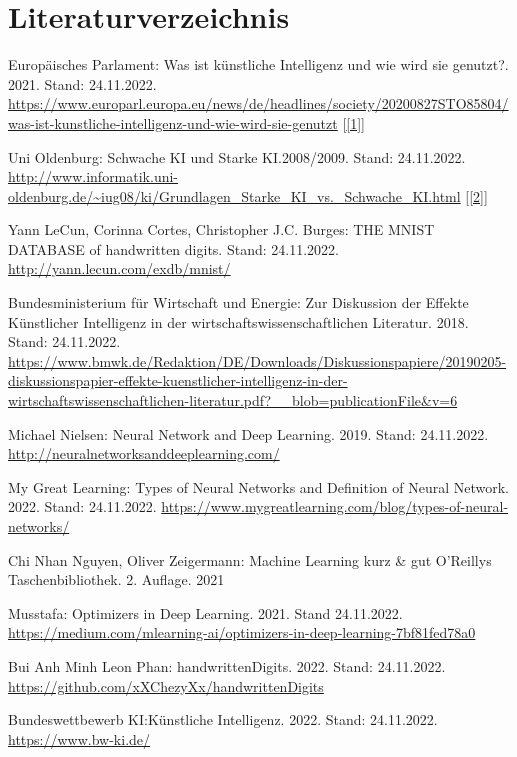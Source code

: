 \documentclass[11pt]{article}
\begin{document}
\newpage
\nolinenumbers{}
\section{Literaturverzeichnis}
{\renewcommand{\section}[2]{}
\hypersetup{linkcolor=red}
\renewcommand\UrlFont{\color{black}\normalfont}
\begin{thebibliography}{15}

    Europäisches Parlament: Was ist künstliche Intelligenz und wie wird sie genutzt?. 2021. Stand: 24.11.2022.
    \url{https://www.europarl.europa.eu/news/de/headlines/society/20200827STO85804/was-ist-kunstliche-intelligenz-und-wie-wird-sie-genutzt}
    [\ref{1}]
    
    Uni Oldenburg: Schwache KI und Starke KI.\@ 2008/2009. Stand: 24.11.2022.
    \url{http://www.informatik.uni-oldenburg.de/~iug08/ki/Grundlagen_Starke_KI_vs._Schwache_KI.html}
    [\ref{2}]

    Yann LeCun, Corinna Cortes, Christopher J.C. Burges: THE MNIST DATABASE of handwritten digits. Stand: 24.11.2022.
    \url{http://yann.lecun.com/exdb/mnist/}

    Bundesministerium für Wirtschaft und Energie: Zur Diskussion der Effekte Künstlicher Intelligenz in der wirtschaftswissenschaftlichen Literatur. 2018. Stand: 24.11.2022.
    \url{https://www.bmwk.de/Redaktion/DE/Downloads/Diskussionspapiere/20190205-diskussionspapier-effekte-kuenstlicher-intelligenz-in-der-wirtschaftswissenschaftlichen-literatur.pdf?__blob=publicationFile&v=6}

    Michael Nielsen: Neural Network and Deep Learning. 2019. Stand: 24.11.2022.
    \url{http://neuralnetworksanddeeplearning.com/}

    My Great Learning: Types of Neural Networks and Definition of Neural Network. 2022. Stand: 24.11.2022.
    \url{https://www.mygreatlearning.com/blog/types-of-neural-networks/}

    Chi Nhan Nguyen, Oliver Zeigermann: Machine Learning kurz \& gut O’Reillys Taschenbibliothek. 2. Auflage. 2021

    Musstafa: Optimizers in Deep Learning. 2021. Stand 24.11.2022.
    \url{https://medium.com/mlearning-ai/optimizers-in-deep-learning-7bf81fed78a0}

    Bui Anh Minh Leon Phan: handwrittenDigits. 2022. Stand: 24.11.2022.
    \url{https://github.com/xXChezyXx/handwrittenDigits}

    Bundeswettbewerb KI:\@ Künstliche Intelligenz. 2022. Stand: 24.11.2022.
    \url{https://www.bw-ki.de/}

\end{thebibliography}
}
\newpage
\end{document}
